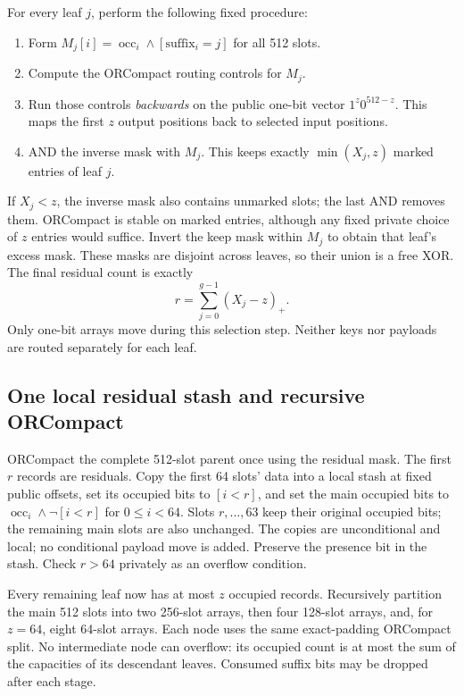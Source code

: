 \documentclass[11pt]{article}
\newcommand{\AND}{\mathbin{\wedge}}
\newcommand{\occ}{\operatorname{occ}}
\begin{document}
For every leaf $j$, perform the following fixed procedure:
\begin{enumerate}
\item Form $M_j[i]=\occ_i\AND[\mathrm{suffix}_i=j]$ for all 512 slots.
\item Compute the ORCompact routing controls for $M_j$.
\item Run those controls \emph{backwards} on the public one-bit vector
      $1^z0^{512-z}$. This maps the first $z$ output positions back to
      selected input positions.
\item AND the inverse mask with $M_j$. This keeps exactly
      $\min(X_j,z)$ marked entries of leaf $j$.
\end{enumerate}
If $X_j<z$, the inverse mask also contains unmarked slots; the last AND
removes them. ORCompact is stable on marked entries, although any fixed
private choice of $z$ entries would suffice. Invert the keep mask within
$M_j$ to obtain that leaf's excess mask. These masks are disjoint across
leaves, so their union is a free XOR. The final residual count is exactly
\begin{equation}\label{eq:residual}
 r=\sum_{j=0}^{g-1}(X_j-z)_+.
\end{equation}
Only one-bit arrays move during this selection step. Neither keys nor
payloads are routed separately for each leaf.

\subsection{One local residual stash and recursive ORCompact}
ORCompact the complete 512-slot parent once using the residual mask. The
first $r$ records are residuals. Copy the first 64 slots' data into a local
stash at fixed public offsets, set its occupied bits to $[i<r]$, and set
the main occupied bits to $\occ_i\AND\neg[i<r]$ for $0\le i<64$.
Slots $r,\ldots,63$ keep their original occupied bits; the remaining main
slots are also unchanged. The copies are unconditional and
local; no conditional payload move is added. Preserve the presence bit in
the stash. Check $r>64$ privately as an overflow condition.

Every remaining leaf now has at most $z$ occupied records. Recursively
partition the main 512 slots into two 256-slot arrays, then four 128-slot
arrays, and, for $z=64$, eight 64-slot arrays. Each node uses the same
exact-padding ORCompact split. No intermediate node can overflow: its
occupied count is at most the sum of the capacities of its descendant
leaves. Consumed suffix bits may be dropped after each stage.
\end{document}
